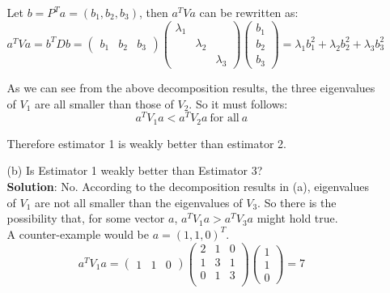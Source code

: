 \documentclass{article}
\begin{document}
\begin{enumerate}
\begin{enumerate}
        Let $b = P^Ta = (b_1, b_2, b_3)$, then $a^TVa$ can be rewritten as:
        $$ a^TVa = b^TDb = 
        \begin{pmatrix}b_1 & b_2 & b_3\end{pmatrix} 
        \begin{pmatrix}\lambda_1 & & \\ & \lambda_2 & \\ & & \lambda_3 \end{pmatrix}
        \begin{pmatrix}b_1 \\ b_2 \\ b_3\end{pmatrix}
        = \lambda_1 b_1^2 + \lambda_2 b_2^2 + \lambda_3 b_3^2
        $$
        
        As we can see from the above decomposition results, the three eigenvalues of $V_1$ are all smaller than those of $V_2$. So it must follows:
        $$ a^T V_1 a < a^T V_2 a\ \textrm{for all}\ a $$
        
        Therefore estimator 1 is weakly better than estimator 2.\\
        
        \item[(b)] Is Estimator 1 weakly better than Estimator 3? \\
        
        \textbf{Solution}: No. According to the decomposition results in (a), eigenvalues of $V_1$ are not all smaller than the eigenvalues of $V_3$. So there is the possibility that, for some vector $a$, $a^TV_1a > a^TV_3a$ might hold true. \\
        
        A counter-example would be $a = (1,1,0)^T$.
        $$ a^T V_1 a = 
        \begin{pmatrix}1 &1 &0\end{pmatrix} 
        \begin{pmatrix}
            2 & 1 & 0 \\
            1 & 3 & 1 \\
            0 & 1 & 3 \\
        \end{pmatrix}
        \begin{pmatrix}1\\ 1\\ 0\end{pmatrix}
        = 7
        $$
        

\end{enumerate}
\end{enumerate}
\end{document}
